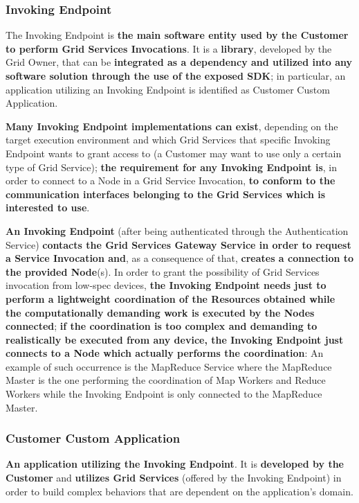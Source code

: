 \subsubsection{Invoking Endpoint}
The Invoking Endpoint is \textbf{the main software entity used by the Customer to perform Grid Services Invocations}. It is a \textbf{library}, developed by the Grid Owner, that can be \textbf{integrated as a dependency and utilized into any software solution through the use of the exposed SDK}; in particular, an application utilizing an Invoking Endpoint is identified as Customer Custom Application.

\textbf{Many Invoking Endpoint implementations can exist}, depending on the target execution environment and which Grid Services that specific Invoking Endpoint wants to grant access to (a Customer may want to use only a certain type of Grid Service); \textbf{the requirement for any Invoking Endpoint is}, in order to connect to a Node in a Grid Service Invocation, \textbf{to conform to the communication interfaces belonging to the Grid Services which is interested to use}.

\textbf{An Invoking Endpoint} (after being authenticated through the Authentication Service) \textbf{contacts the Grid Services Gateway Service in order to request a Service Invocation and}, as a consequence of that, \textbf{creates a connection to the provided Node}(s). In order to grant the possibility of Grid Services invocation from low-spec devices, \textbf{the Invoking Endpoint needs just to perform a lightweight coordination of the Resources obtained while the computationally demanding work is executed by the Nodes connected}; \textbf{if the coordination is too complex and demanding to realistically be executed from any device, the Invoking Endpoint just connects to a Node which actually performs the coordination}: An example of such occurrence is the MapReduce Service where the MapReduce Master is the one performing the coordination of Map Workers and Reduce Workers while the Invoking Endpoint is only connected to the MapReduce Master.

\subsubsection{Customer Custom Application}
\textbf{An application utilizing the Invoking Endpoint}. It is \textbf{developed by the Customer} and \textbf{utilizes Grid Services} (offered by the Invoking Endpoint) in order to build complex behaviors that are dependent on the application's domain.

